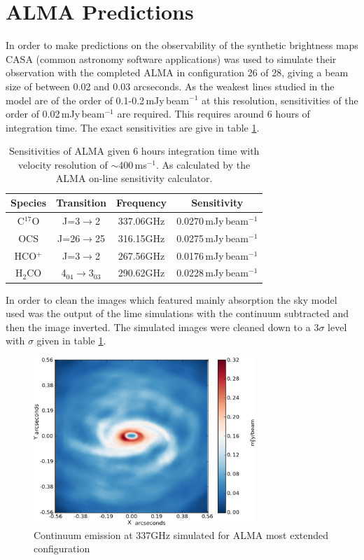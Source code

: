 \documentclass[useAMS,usenatbib]{mn2e}
\begin{document}
\section{ALMA Predictions} \label{sec:alma_predictions}

In order to make predictions on the observability of the synthetic brightness maps CASA (common astronomy software applications) was used to simulate their observation with the completed ALMA in configuration 26 of 28, giving a beam size of between 0.02 and 0.03 arcseconds. As the weakest lines studied in the model are of the order of 0.1-0.2$\,$mJy$\,$beam$^{-1}$ at this resolution, sensitivities of the order of 0.02$\,$mJy$\,$beam$^{-1}$ are required. This requires around 6 hours of integration time. The exact sensitivities are give in table \ref{sigmas}.
\begin{table}
 \centering
 \begin{minipage}{80mm}
   \caption{Sensitivities of ALMA given 6 hours integration time with velocity resolution of $\sim$400$\,$ms$^{-1}$. As calculated by the ALMA on-line sensitivity calculator.}
   \label{sigmas}
   \begin{tabular}{c||c|c|c}
     \hline
     Species & Transition & Frequency & Sensitivity\\
     \hline
     C$^{17}$O & J=3$\rightarrow$2 & 337.06GHz & 0.0270$\,$mJy$\,$beam$^{-1}$ \\
     OCS & J=26$\rightarrow$25 & 316.15GHz & 0.0275$\,$mJy$\,$beam$^{-1}$ \\
     HCO$^+$ & J=3$\rightarrow$2 & 267.56GHz & 0.0176$\,$mJy$\,$beam$^{-1}$ \\
     H$_2$CO & 4$_{04}\rightarrow$3$_{03}$ & 290.62GHz & 0.0228$\,$mJy$\,$beam$^{-1}$ \\
     \hline
   \end{tabular}
 \end{minipage}
\end{table}
In order to clean the images which featured mainly absorption the sky model used was the output of the lime simulations with the continuum subtracted and then the image inverted. The simulated images were cleaned down to a 3$\sigma$ level with $\sigma$ given in table \ref{sigmas}.\newline

\begin{figure}
 \includegraphics[width=84mm]{Figures/sim/casa_cont_337GHz.eps}

 \caption{Continuum emission at 337GHz simulated for ALMA most extended configuration}
 \label{continuum}
\end{figure}
\end{document}
